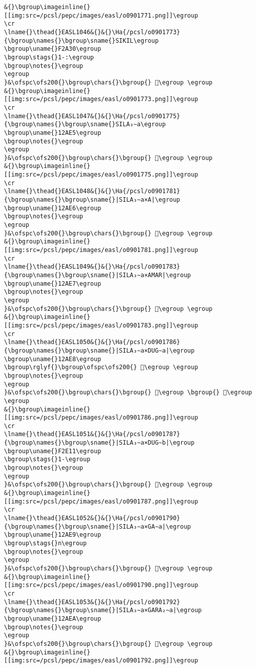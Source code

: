 \begin{verbatim}
&{}\bgroup\imageinline{}[[img:src=/pcsl/pepc/images/easl/o0901771.png]]\egroup
\cr
\lname{}\thead{}EASL1046&{}&{}\Ha{/pcsl/o0901773}{\bgroup\names{}\bgroup\sname{}SIKIL\egroup
\bgroup\uname{}F2A30\egroup
\bgroup\stags{}1-:\egroup
\bgroup\notes{}\egroup
\egroup
}&\ofspc\ofs200{}\bgroup\chars{}\bgroup{} 󲨰\egroup \egroup
&{}\bgroup\imageinline{}[[img:src=/pcsl/pepc/images/easl/o0901773.png]]\egroup
\cr
\lname{}\thead{}EASL1047&{}&{}\Ha{/pcsl/o0901775}{\bgroup\names{}\bgroup\sname{}SILA₃∼a\egroup
\bgroup\uname{}12AE5\egroup
\bgroup\notes{}\egroup
\egroup
}&\ofspc\ofs200{}\bgroup\chars{}\bgroup{} 𒫥\egroup \egroup
&{}\bgroup\imageinline{}[[img:src=/pcsl/pepc/images/easl/o0901775.png]]\egroup
\cr
\lname{}\thead{}EASL1048&{}&{}\Ha{/pcsl/o0901781}{\bgroup\names{}\bgroup\sname{}|SILA₃∼a×A|\egroup
\bgroup\uname{}12AE6\egroup
\bgroup\notes{}\egroup
\egroup
}&\ofspc\ofs200{}\bgroup\chars{}\bgroup{} 𒫦\egroup \egroup
&{}\bgroup\imageinline{}[[img:src=/pcsl/pepc/images/easl/o0901781.png]]\egroup
\cr
\lname{}\thead{}EASL1049&{}&{}\Ha{/pcsl/o0901783}{\bgroup\names{}\bgroup\sname{}|SILA₃∼a×AMAR|\egroup
\bgroup\uname{}12AE7\egroup
\bgroup\notes{}\egroup
\egroup
}&\ofspc\ofs200{}\bgroup\chars{}\bgroup{} 𒫧\egroup \egroup
&{}\bgroup\imageinline{}[[img:src=/pcsl/pepc/images/easl/o0901783.png]]\egroup
\cr
\lname{}\thead{}EASL1050&{}&{}\Ha{/pcsl/o0901786}{\bgroup\names{}\bgroup\sname{}|SILA₃∼a×DUG∼a|\egroup
\bgroup\uname{}12AE8\egroup
\bgroup\rglyf{}\bgroup\ofspc\ofs200{} 𒫨\egroup \egroup
\bgroup\notes{}\egroup
\egroup
}&\ofspc\ofs200{}\bgroup\chars{}\bgroup{} 𒬉\egroup \bgroup{} 𒫨\egroup \egroup
&{}\bgroup\imageinline{}[[img:src=/pcsl/pepc/images/easl/o0901786.png]]\egroup
\cr
\lname{}\thead{}EASL1051&{}&{}\Ha{/pcsl/o0901787}{\bgroup\names{}\bgroup\sname{}|SILA₃∼a×DUG∼b|\egroup
\bgroup\uname{}F2E11\egroup
\bgroup\stags{}1-\egroup
\bgroup\notes{}\egroup
\egroup
}&\ofspc\ofs200{}\bgroup\chars{}\bgroup{} 󲸑\egroup \egroup
&{}\bgroup\imageinline{}[[img:src=/pcsl/pepc/images/easl/o0901787.png]]\egroup
\cr
\lname{}\thead{}EASL1052&{}&{}\Ha{/pcsl/o0901790}{\bgroup\names{}\bgroup\sname{}|SILA₃∼a×GA∼a|\egroup
\bgroup\uname{}12AE9\egroup
\bgroup\stags{}n\egroup
\bgroup\notes{}\egroup
\egroup
}&\ofspc\ofs200{}\bgroup\chars{}\bgroup{} 𒫩\egroup \egroup
&{}\bgroup\imageinline{}[[img:src=/pcsl/pepc/images/easl/o0901790.png]]\egroup
\cr
\lname{}\thead{}EASL1053&{}&{}\Ha{/pcsl/o0901792}{\bgroup\names{}\bgroup\sname{}|SILA₃∼a×GARA₂∼a|\egroup
\bgroup\uname{}12AEA\egroup
\bgroup\notes{}\egroup
\egroup
}&\ofspc\ofs200{}\bgroup\chars{}\bgroup{} 𒫪\egroup \egroup
&{}\bgroup\imageinline{}[[img:src=/pcsl/pepc/images/easl/o0901792.png]]\egroup

\end{verbatim}
